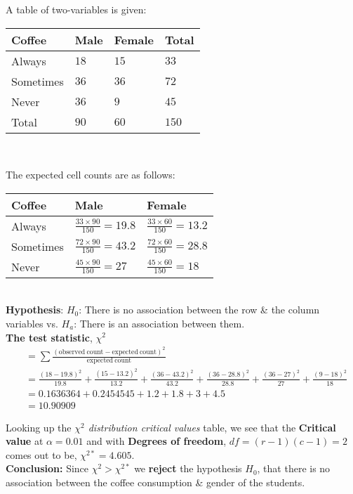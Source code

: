 \documentclass[boxes, qed]{homework}
\begin{document}
\begin{problem}
  A table of two-variables is given:\\
 
  \begin{tabular}{l|l|l|l}
    \hline
    Coffee & Male & Female & Total \\
    \hline
    Always &    $18$ & $15$ & $33$ \\
    Sometimes & $36$ & $36$ & $72$ \\
    Never &     $36$ & $9$ &  $45$ \\
    \hline
    Total &     $90$ & $60$ & $150$ \\
    \hline
  \end{tabular}\\
\end{problem}

\begin{solution}
  The expected cell counts are as follows:\\

  \begin{tabular}{l|l|l}
    \hline
    Coffee & Male & Female \\
    \hline
    Always &    $\frac{33\times 90}{150}=19.8$ & $\frac{33\times 60}{150}=13.2$ \\
    Sometimes & $\frac{72\times 90}{150}=43.2$ & $\frac{72\times 60}{150}=28.8$ \\
    Never &     $\frac{45\times 90}{150}=27$ & $\frac{45\times 60}{150}=18$ \\
    \hline
  \end{tabular}\\

  \textbf{Hypothesis}: $H_0$: There is no association between the row \& the column variables vs.
  $H_a$: There is an association between them. \\

  \textbf{The test statistic}, $\chi^2$
  \begin{align*}
    &=\sum{\frac{(\mathrm{observed\ count}-\mathrm{expected\ count})^2}{\mathrm{expected\ count}}}\\
    &=\frac{(18-19.8)^2}{19.8} 
    +\frac{(15-13.2)^2}{13.2} 
    +\frac{(36-43.2)^2}{43.2} 
    +\frac{(36-28.8)^2}{28.8}
    +\frac{(36-27)^2}{27}
    +\frac{(9-18)^2}{18}\\
    &=0.1636364+0.2454545+1.2+1.8+3+4.5\\
    &=10.90909
  \end{align*}

  Looking up the \textit{$\chi^2$ distribution critical values} table, we see that
  the \textbf{Critical value} at $\alpha=0.01$ and
  with \textbf{Degrees of freedom}, $df=(r-1)(c-1)=2$ comes out to be,
  $\chi^{2*}=4.605$.\\

  \textbf{Conclusion:}
  Since $\chi^2>\chi^{2*}$ we \textbf{reject} the hypothesis $H_0$, that there 
  is no association between the coffee consumption \& gender of the students.
\end{solution}
\end{document}
